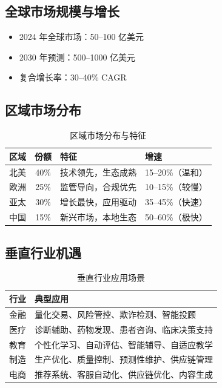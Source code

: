 \documentclass[
  customlatinfont = macos,
]{hkustthesis}
\begin{document}
\subsection{全球市场规模与增长}

\begin{itemize}[nosep]
  \item 2024 年全球市场：50--100 亿美元
  \item 2030 年预测：500--1000 亿美元
  \item 复合增长率：30--40\% CAGR
\end{itemize}

\subsection{区域市场分布}

\begin{table}[htbp]
\centering
\caption{区域市场分布与特征}
\label{tab:regional}
\begin{tabular}{@{}lcll@{}}
\toprule
\textbf{区域} & \textbf{份额} & \textbf{特征} & \textbf{增速} \\
\midrule
北美       & 40\% & 技术领先，生态成熟   & 15--20\%（温和） \\
欧洲       & 25\% & 监管导向，合规优先   & 10--15\%（较慢） \\
亚太       & 30\% & 增长最快，应用驱动   & 35--45\%（快速） \\
中国       & 15\% & 新兴市场，本地生态   & 50--60\%（极快） \\
\bottomrule
\end{tabular}
\end{table}

\subsection{垂直行业机遇}

\begin{table}[htbp]
\centering
\caption{垂直行业应用场景}
\label{tab:verticals}
\begin{tabular}{@{}lp{9cm}@{}}
\toprule
\textbf{行业} & \textbf{典型应用} \\
\midrule
金融   & 量化交易、风险管控、欺诈检测、智能投顾 \\
医疗   & 诊断辅助、药物发现、患者咨询、临床决策支持 \\
教育   & 个性化学习、自动评估、智能辅导、自适应教学 \\
制造   & 生产优化、质量控制、预测性维护、供应链管理 \\
电商   & 推荐系统、客服自动化、供应链优化、内容生成 \\
\bottomrule
\end{tabular}
\end{table}
\end{document}
